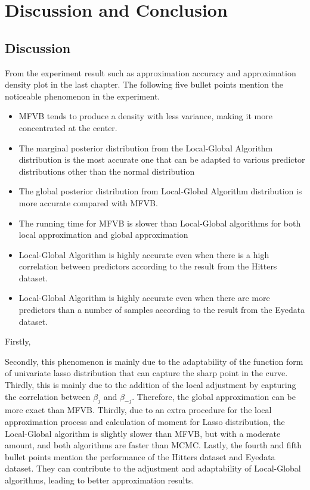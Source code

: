 \chapter{Discussion and Conclusion}

\section{Discussion}
From the experiment result such as approximation accuracy and approximation density plot in the last chapter. The following five bullet points mention the noticeable phenomenon in the experiment.
\begin{itemize}
	\item MFVB tends to produce a density with less variance, making it more concentrated at the center.
	\item The marginal posterior distribution from the Local-Global Algorithm distribution is the most accurate one that can be adapted to various predictor distributions other than the normal distribution
	\item The global posterior distribution from Local-Global Algorithm distribution is more accurate compared with MFVB.
	\item The running time for MFVB is slower than Local-Global algorithms for both local approximation and global approximation
	\item Local-Global Algorithm is highly accurate even when there is a high correlation between predictors according to the result from the Hitters dataset.
	\item Local-Global Algorithm is highly accurate even when there are more predictors than a number of samples according to the result from the Eyedata dataset.
\end{itemize}
Firstly,

Secondly, this phenomenon is mainly due to the adaptability of the function form of univariate lasso distribution that can capture the sharp point in the curve.
Thirdly, this is mainly due to the addition of the local adjustment by capturing the correlation between $\beta_j$ and $\beta_{-j}$. Therefore, the global approximation can be more exact than MFVB.
Thirdly, due to an extra procedure for the local approximation process and calculation of moment for Lasso distribution, the Local-Global algorithm is slightly slower than MFVB, but with a moderate amount, and both algorithms are faster than MCMC.
Lastly, the fourth and fifth bullet points mention the performance of the Hitters dataset and Eyedata dataset. They can contribute to the adjustment and adaptability of Local-Global algorithms, leading to better approximation results.











